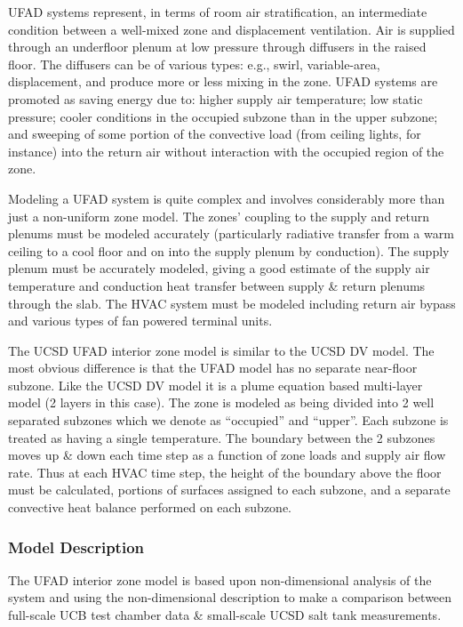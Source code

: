 UFAD systems represent, in terms of room air stratification, an intermediate condition between a well-mixed zone and displacement ventilation. Air is supplied through an underfloor plenum at low pressure through diffusers in the raised floor. The diffusers can be of various types: e.g., swirl, variable-area, displacement, and produce more or less mixing in the zone. UFAD systems are promoted as saving energy due to: higher supply air temperature; low static pressure; cooler conditions in the occupied subzone than in the upper subzone; and sweeping of some portion of the convective load (from ceiling lights, for instance) into the return air without interaction with the occupied region of the zone.

Modeling a UFAD system is quite complex and involves considerably more than just a non-uniform zone model. The zones' coupling to the supply and return plenums must be modeled accurately (particularly radiative transfer from a warm ceiling to a cool floor and on into the supply plenum by conduction). The supply plenum must be accurately modeled, giving a good estimate of the supply air temperature and conduction heat transfer between supply \& return plenums through the slab. The HVAC system must be modeled including return air bypass and various types of fan powered terminal units.

The UCSD UFAD interior zone model is similar to the UCSD DV model. The most obvious difference is that the UFAD model has no separate near-floor subzone. Like the UCSD DV model it is a plume equation based multi-layer model (2 layers in this case). The zone is modeled as being divided into 2 well separated subzones which we denote as ``occupied'' and ``upper''. Each subzone is treated as having a single temperature. The boundary between the 2 subzones moves up \& down each time step as a function of zone loads and supply air flow rate. Thus at each HVAC time step, the height of the boundary above the floor must be calculated, portions of surfaces assigned to each subzone, and a separate convective heat balance performed on each subzone.

\subsubsection{Model Description}\label{model-description-1-001}

The UFAD interior zone model is based upon non-dimensional analysis of the system and using the non-dimensional description to make a comparison between full-scale UCB test chamber data \& small-scale UCSD salt tank measurements.

